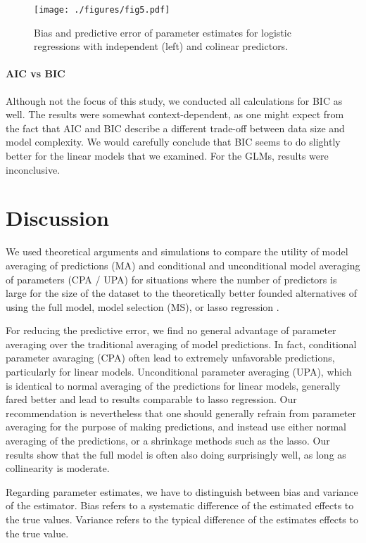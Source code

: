 \documentclass[5p]{elsarticle}
\begin{document}
\begin{figure*}\label{fig: logistic model}
\texttt{[image: ./figures/fig5.pdf]}
\caption{Bias and predictive error of parameter estimates for logistic regressions with independent (left) and colinear predictors.}
\end{figure*}

\paragraph{AIC vs BIC}

Although not the focus of this study, we conducted all calculations for BIC as well. The results were somewhat context-dependent, as one might expect from the fact that AIC and BIC describe a different trade-off between data size and model complexity. We would carefully conclude that BIC seems to do slightly better for the linear models that we examined. For the GLMs, results were inconclusive. 


\section{Discussion}

We used theoretical arguments and simulations to compare the utility of model averaging of predictions (MA) and conditional and unconditional model averaging of parameters (CPA / UPA) for situations where the number of predictors is large for the size of the dataset to the theoretically better founded alternatives of using the full model, model selection (MS), or lasso regression . 

For reducing the predictive error, we find no general advantage of parameter averaging over the traditional averaging of model predictions. In fact, conditional parameter avaraging (CPA) often lead to extremely unfavorable predictions, particularly for linear models. Unconditional parameter averaging (UPA), which is identical to normal averaging of the predictions for linear models, generally fared better and lead to results comparable to lasso regression. Our recommendation is nevertheless that one should generally refrain from parameter averaging for the purpose of making predictions, and instead use either normal averaging of the predictions, or a shrinkage methods such as the lasso. Our results show that the full model is often also doing surprisingly well, as long as collinearity is moderate. 

Regarding parameter estimates, we have to distinguish between bias and variance of the estimator. Bias refers to a systematic difference of the estimated effects to the true values. Variance refers to the typical difference of the estimates effects to the true value. 
\end{document}
